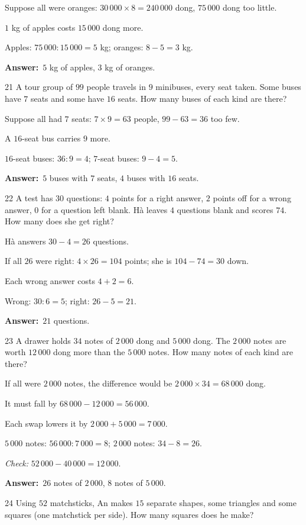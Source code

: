 \documentclass[11pt]{article}
\newif\ifsol \solfalse
\providecommand{\AnsWord}{Đáp số}
\newcommand{\dapso}[1]{\par\textbf{\AnsWord:}\ #1}
\newcommand{\probsol}[1]{%
  \begin{lrbox}{\solmeasure}\begin{minipage}{\dimexpr\linewidth-24pt\relax}#1\end{minipage}\end{lrbox}%
  \ifsol
    \begin{solbox}#1\end{solbox}%
  \else
    \setlength{\solht}{\dimexpr\ht\solmeasure+\dp\solmeasure+0.85cm\relax}%
    \ifdim\solht<1.35cm\setlength{\solht}{1.35cm}\fi
    \begin{tcolorbox}[colback=white,colframe=Line,boxrule=0.8pt,arc=5pt,
      left=8pt,right=8pt,top=4pt,bottom=4pt,height=\solht]{\footnotesize\color{Slate}\itshape\WorkWord}\end{tcolorbox}%
  \fi}
\newcommand{\gap}{\vspace{0.3cm}}
\def\WorkWord{Your work:}
\def\AnsWord{Answer}
\begin{document}
\probsol{
Suppose all were oranges: $30\,000\times8=240\,000$ dong, $75\,000$ dong too little.\par
$1$ kg of apples costs $15\,000$ dong more.\par
Apples: $75\,000:15\,000=5$ kg; oranges: $8-5=3$ kg.
\dapso{$5$ kg of apples, $3$ kg of oranges.}}
\gap
\begin{probbox}{21}{\relax}
A tour group of $99$ people travels in $9$ minibuses, every seat taken. Some buses have $7$ seats and some have $16$ seats. How many buses of each kind are there?
\end{probbox}
\probsol{
Suppose all had $7$ seats: $7\times9=63$ people, $99-63=36$ too few.\par
A $16$-seat bus carries $9$ more.\par $16$-seat buses: $36:9=4$; $7$-seat buses: $9-4=5$.
\dapso{$5$ buses with $7$ seats, $4$ buses with $16$ seats.}}
\gap
\begin{probbox}{22}{\relax}
A test has $30$ questions: $4$ points for a right answer, $2$ points off for a wrong answer, $0$ for a question left blank. Hà leaves $4$ questions blank and scores $74$. How many does she get right?
\end{probbox}
\probsol{
Hà answers $30-4=26$ questions.\par If all $26$ were right: $4\times26=104$ points; she is $104-74=30$ down.\par
Each wrong answer costs $4+2=6$.\par Wrong: $30:6=5$; right: $26-5=21$.
\dapso{$21$ questions.}}
\gap
\begin{probbox}{23}{\relax}
A drawer holds $34$ notes of $2\,000$ dong and $5\,000$ dong. The $2\,000$ notes are worth $12\,000$ dong more than the $5\,000$ notes. How many notes of each kind are there?
\end{probbox}
\probsol{
If all were $2\,000$ notes, the difference would be $2\,000\times34=68\,000$ dong.\par
It must fall by $68\,000-12\,000=56\,000$.\par
Each swap lowers it by $2\,000+5\,000=7\,000$.\par
$5\,000$ notes: $56\,000:7\,000=8$; $2\,000$ notes: $34-8=26$.\par \emph{Check:} $52\,000-40\,000=12\,000$.
\dapso{$26$ notes of $2\,000$, $8$ notes of $5\,000$.}}
\gap
\begin{probbox}{24}{\relax}
Using $52$ matchsticks, An makes $15$ separate shapes, some triangles and some squares (one matchstick per side). How many squares does he make?
\end{probbox}
\end{document}
